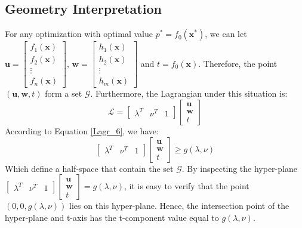 \documentclass[10pt,a4paper]{article}
\begin{document}
\subsection{Geometry Interpretation}
For any optimization with optimal value $p^{*} = f_{0}(\mathbf{x}^{*})$, we can let $\mathbf{u} = \begin{bmatrix}
	f_{1}(\mathbf{x}) \\
	f_{2}(\mathbf{x}) \\
	\vdots \\
	f_{n}(\mathbf{x})
\end{bmatrix}$, $\mathbf{w} = \begin{bmatrix}
	h_{1}(\mathbf{x}) \\
	h_{2}(\mathbf{x}) \\
	\vdots \\
	h_{m}(\mathbf{x})
\end{bmatrix}$ and $t = f_{0}(\mathbf{x})$. Therefore, the point $(\mathbf{u}, \mathbf{w}, t)$ form a set $\mathcal{G}$. Furthermore, the Lagrangian under this situation is:
\begin{equation*}
	\mathcal{L} = 
	\begin{bmatrix}
		\lambda^{T} & \nu^{T} & 1
	\end{bmatrix}
	\begin{bmatrix}
		\mathbf{u} \\
		\mathbf{w} \\
		t
	\end{bmatrix}
\end{equation*}
According to Equation \ref{Lagr_6}, we have:
\begin{equation*}
	\begin{bmatrix}
		\lambda^{T} & \nu^{T} & 1
	\end{bmatrix}
	\begin{bmatrix}
		\mathbf{u} \\
		\mathbf{w} \\
		t
	\end{bmatrix} \geq g(\lambda, \nu)
\end{equation*}
Which define a half-space that contain the set $\mathcal{G}$. By inspecting the hyper-plane $\begin{bmatrix}
		\lambda^{T} & \nu^{T} & 1
	\end{bmatrix}
	\begin{bmatrix}
		\mathbf{u} \\
		\mathbf{w} \\
		t
	\end{bmatrix} = g(\lambda, \nu)$, it is easy to verify that the point $(0, 0, g(\lambda, \nu))$ lies on this hyper-plane. Hence, the intersection point of the hyper-plane and t-axis has the t-component value equal to $g(\lambda, \nu)$.
	
\end{document}

